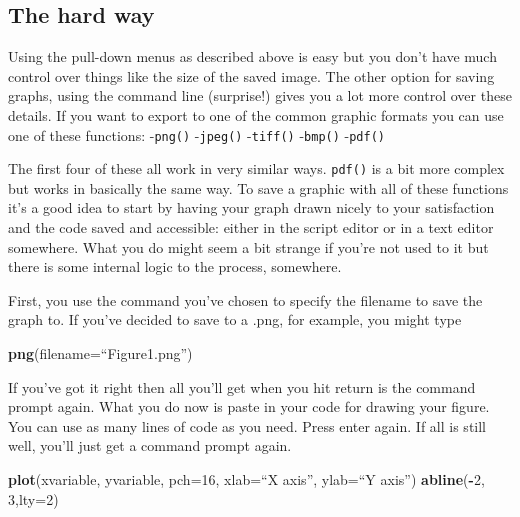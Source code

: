 \documentclass[
]{book}
\newenvironment{Shaded}{\begin{snugshade}}{\end{snugshade}}
\newcommand{\DataTypeTok}[1]{\textcolor[rgb]{0.13,0.29,0.53}{#1}}
\newcommand{\DecValTok}[1]{\textcolor[rgb]{0.00,0.00,0.81}{#1}}
\newcommand{\KeywordTok}[1]{\textcolor[rgb]{0.13,0.29,0.53}{\textbf{#1}}}
\newcommand{\NormalTok}[1]{#1}
\newcommand{\OperatorTok}[1]{\textcolor[rgb]{0.81,0.36,0.00}{\textbf{#1}}}
\begin{document}
\hypertarget{the-hard-way}{%
\subsection{The hard way}\label{the-hard-way}}

Using the pull-down menus as described above is easy but you don't have much control over things like the size of the saved image. The other option for saving graphs, using the command line (surprise!) gives you a lot more control over these details. If you want to export to one of the common graphic formats you can use one of these functions:
-\texttt{png()}
-\texttt{jpeg()}
-\texttt{tiff()}
-\texttt{bmp()}
-\texttt{pdf()}

The first four of these all work in very similar ways. \texttt{pdf()} is a bit more complex but works in basically the same way. To save a graphic with all of these functions it's a good idea to start by having your graph drawn nicely to your satisfaction and the code saved and accessible: either in the script editor or in a text editor somewhere. What you do might seem a bit strange if you're not used to it but there is some internal logic to the process, somewhere.

First, you use the command you've chosen to specify the filename to save the graph to. If you've decided to save to a .png, for example, you might type

\begin{Shaded}
\begin{Highlighting}[]
\KeywordTok{png}\NormalTok{(}\DataTypeTok{filename=}\NormalTok{“Figure1.png”)}
\end{Highlighting}
\end{Shaded}

If you've got it right then all you'll get when you hit return is the command prompt again. What you do now is paste in your code for drawing your figure. You can use as many lines of code as you need. Press enter again. If all is still well, you'll just get a command prompt again.

\begin{Shaded}
\begin{Highlighting}[]
\KeywordTok{plot}\NormalTok{(xvariable, yvariable, }\DataTypeTok{pch=}\DecValTok{16}\NormalTok{, }\DataTypeTok{xlab=}\NormalTok{“X axis”, }\DataTypeTok{ylab=}\NormalTok{“Y axis”)}
\KeywordTok{abline}\NormalTok{(}\OperatorTok{-}\DecValTok{2}\NormalTok{, }\DecValTok{3}\NormalTok{,}\DataTypeTok{lty=}\DecValTok{2}\NormalTok{)}
\end{Highlighting}
\end{Shaded}
\end{document}
